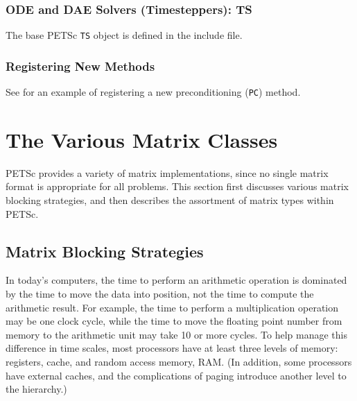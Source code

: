 \subsection{ODE and DAE Solvers (Timesteppers): TS}
The base PETSc \lstinline{TS} object is defined in the \href{http://www.mcs.anl.gov/petsc/petsc-master/include/petsc/private/tsimpl.h.html}{} include file.

\subsection{Registering New Methods}
\label{sec:registeringnewmethods}

See \href{http://www.mcs.anl.gov/petsc/petsc-master/src/ksp/ksp/examples/tutorials/ex12.c.html}{} for an example of registering a new preconditioning (\lstinline{PC}) method.



\chapter{The Various Matrix Classes}
\label{sec:matclasses}

PETSc provides a variety of matrix implementations, since no single
matrix format is appropriate for all problems.  This section first
discusses various matrix blocking strategies, and then
describes the assortment of matrix types within PETSc.

\section{Matrix Blocking Strategies}

In today's computers, the time to perform an arithmetic operation is
dominated by the time to move the data into position, not the time to
compute the arithmetic result.  For example, the time to perform a
multiplication operation may be one clock cycle, while the time to
move the floating point number from memory to the arithmetic unit may
take 10 or more cycles. To help manage this difference in time scales,
most processors have at least three levels of memory: registers,
cache, and random access memory, RAM. (In addition, some processors
have external caches, and the complications of paging introduce
another level to the hierarchy.)

